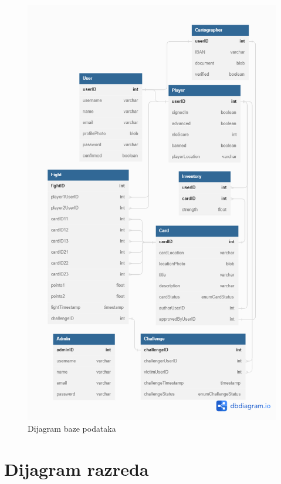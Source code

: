 				\begin{figure}[H]
        			\includegraphics[scale=0.45]{slike/ERdiagram.png}
        			\centering
        			\caption{Dijagram baze podataka}
        			\label{fig:DBmodel}
        		\end{figure}
			
			\eject
			
			
		\section{Dijagram razreda}
		
			
